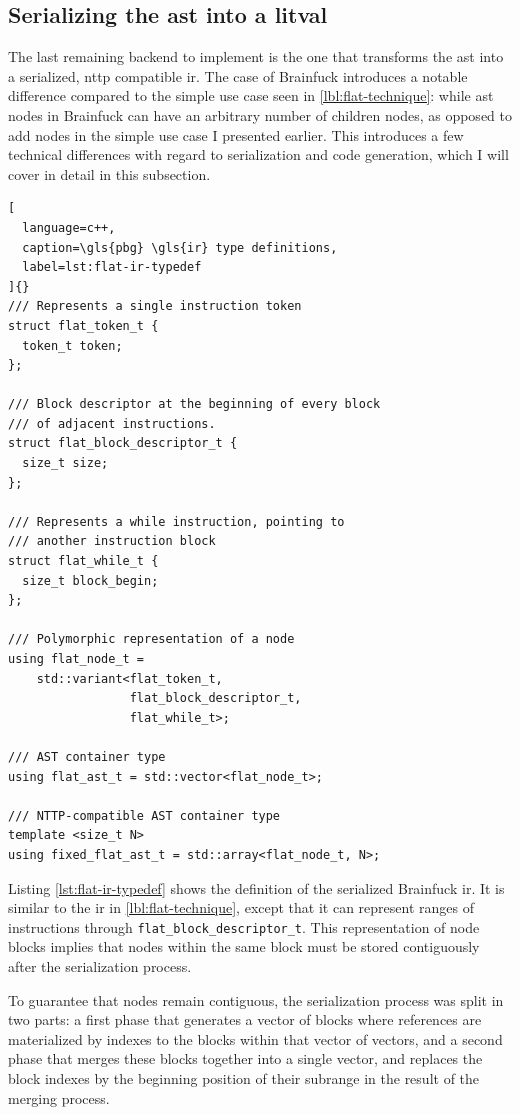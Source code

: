 \documentclass[../main]{subfiles}
\begin{document}
\subsection{
  Serializing the \gls{ast} into a \gls{litval}
}

The last remaining backend to implement is the one that transforms
the \gls{ast} into a serialized, \gls{nttp} compatible \gls{ir}.
The case of Brainfuck introduces a notable difference compared to the simple
use case seen in \ref{lbl:flat-technique}: while \gls{ast} nodes in Brainfuck
can have an arbitrary number of children nodes, as opposed to add nodes in
the simple use case I presented earlier. This introduces a few technical
differences with regard to serialization and code generation, which I will
cover in detail in this subsection.

\begin{lstlisting}[
  language=c++,
  caption=\gls{pbg} \gls{ir} type definitions,
  label=lst:flat-ir-typedef
]{}
/// Represents a single instruction token
struct flat_token_t {
  token_t token;
};

/// Block descriptor at the beginning of every block
/// of adjacent instructions.
struct flat_block_descriptor_t {
  size_t size;
};

/// Represents a while instruction, pointing to
/// another instruction block
struct flat_while_t {
  size_t block_begin;
};

/// Polymorphic representation of a node
using flat_node_t =
    std::variant<flat_token_t,
                 flat_block_descriptor_t,
                 flat_while_t>;

/// AST container type
using flat_ast_t = std::vector<flat_node_t>;

/// NTTP-compatible AST container type
template <size_t N>
using fixed_flat_ast_t = std::array<flat_node_t, N>;
\end{lstlisting}

Listing \ref{lst:flat-ir-typedef} shows the definition of the serialized
Brainfuck \gls{ir}. It is similar to the \gls{ir} in \ref{lbl:flat-technique},
except that it can represent ranges of instructions through
\lstinline{flat_block_descriptor_t}. This representation of node blocks
implies that nodes within the same block must be stored contiguously
after the serialization process.

To guarantee that nodes remain contiguous, the serialization process was split
in two parts: a first phase that generates a vector of blocks where references
are materialized by indexes to the blocks within that vector of vectors,
and a second phase that merges these blocks together into a single vector,
and replaces the block indexes by the beginning position of their subrange
in the result of the merging process.
\end{document}
